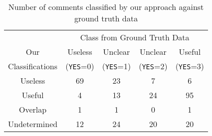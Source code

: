 \begin{table}[h]
\centering
\small
\caption{Number of comments classified by our approach against ground truth data }
\begin{tabular}{ccccc}
\hline
& \multicolumn{4}{c}{Class from Ground Truth Data} \\ \cline{2-5}
Our&  Useless  & Unclear  & Unclear & Useful \\
Classifications&  (\texttt{YES}=0) & (\texttt{YES}=1) & (\texttt{YES}=2) & (\texttt{YES}=3) \\
\hline \hline
Useless & 69 & 23 & 7 & 6 \\
Useful & 4 & 13 & 24 & 95 \\
Overlap & 1 & 1 & 0 & 1 \\
Undetermined & 12 & 24 & 20 & 20 \\
\hline
\end{tabular}
\label{tb:classify_number}
\end{table}


